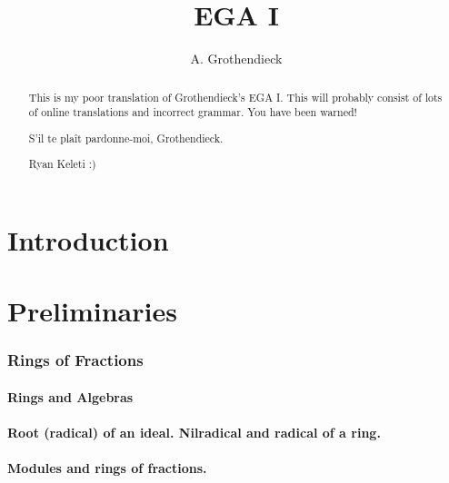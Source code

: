 \documentclass[10pt,oneside]{amsart}
\title{EGA I}
\author{A. Grothendieck}
\begin{document}
\renewcommand{\abstractname}{What this is}
\begin{abstract}
    This is my poor translation of Grothendieck's EGA I. This
    will probably consist of lots of online translations and incorrect grammar.
    You have been warned!

    S'il te pla\^it pardonne-moi, Grothendieck.

    Ryan Keleti :)
\end{abstract}

\maketitle

\noindent\hspace{0.15\linewidth}
\begin{minipage}{0.7\linewidth}
    \tableofcontents{}
\end{minipage}


\clearpage


\part*{Introduction}



\clearpage


\setcounter{part}{-1}

\part{Preliminaries}

    \section{Rings of Fractions}

        \subsection{Rings and Algebras}
        

        \subsection{Root (radical) of an ideal. Nilradical and radical of a ring.}
        

        \subsection{Modules and rings of fractions.}
        
\end{document}

